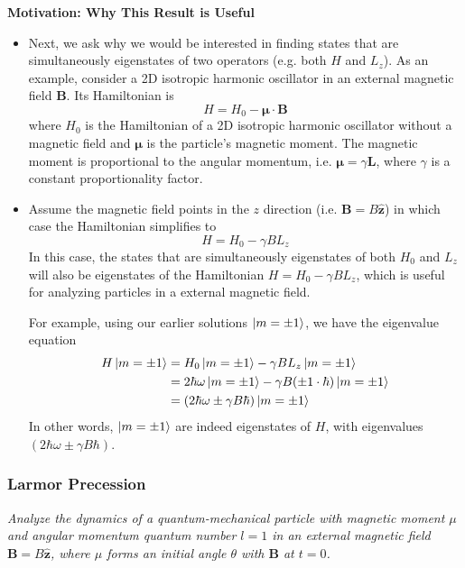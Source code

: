 \documentclass[11pt, a4paper]{article}
\renewcommand{\vec}[1]{\bm{#1}} %
\newcommand{\uvec}[1]{\hat{\vec{#1}}} %
\begin{document}
\textbf{Motivation: Why This Result is Useful}\\
\begin{itemize}
	\item Next, we ask why we would be interested in finding states that are simultaneously eigenstates of two operators (e.g. both $ H $ and $ L_{z} $). As an example, consider a 2D isotropic harmonic oscillator in an external magnetic field $ \vec{B} $. Its Hamiltonian is
	\begin{equation*}
		H = H_{0} - \vec{\mu} \cdot \vec{B}
	\end{equation*}
	where $ H_{0} $ is the Hamiltonian of a 2D isotropic harmonic oscillator without a magnetic field and $ \vec{\mu} $ is the particle's magnetic moment. The magnetic moment is proportional to the angular momentum, i.e. $ \vec{\mu} = \gamma \vec{L} $, where $ \gamma $ is a constant proportionality factor.
	
	\item Assume the magnetic field points in the $ z $ direction (i.e. $ \vec{B} = B \uvec{z} $) in which case the Hamiltonian simplifies to
	\begin{equation*}
		H = H_{0} - \gamma B L_{z}
	\end{equation*}
	In this case, the states that are simultaneously eigenstates of both $ H_{0} $ and $ L_{z} $ will also be eigenstates of the Hamiltonian $ H = H_{0} - \gamma B L_{z}$, which is useful for analyzing particles in  a external magnetic field. 
	
	For example, using our earlier solutions $ \ket{m = \pm 1} $, we have the eigenvalue equation
	\begin{align*}
		H \ket{m = \pm 1} &= H_{0}\ket{m = \pm 1} - \gamma B L_{z} \ket{m = \pm 1} \\
		& = 2\hbar \omega \ket{m = \pm 1} - \gamma B (\pm 1 \cdot \hbar)\ket{m = \pm 1} \\
		&= (2\hbar \omega \pm \gamma B\hbar)\ket{m = \pm 1}
	\end{align*}
	In other words, $ \ket{m = \pm 1} $ are indeed eigenstates of $ H $, with eigenvalues $ (2\hbar \omega \pm \gamma B\hbar) $.
\end{itemize}


\subsubsection{Larmor Precession}
\textit{Analyze the dynamics of a quantum-mechanical particle with magnetic moment $ \mu $ and angular momentum quantum number $ l = 1 $ in an external magnetic field $ \vec{B} = B\uvec{z} $, where $ \mu $ forms an initial angle $ \theta $ with $ \vec{B} $ at $ t = 0 $.}
\end{document}
